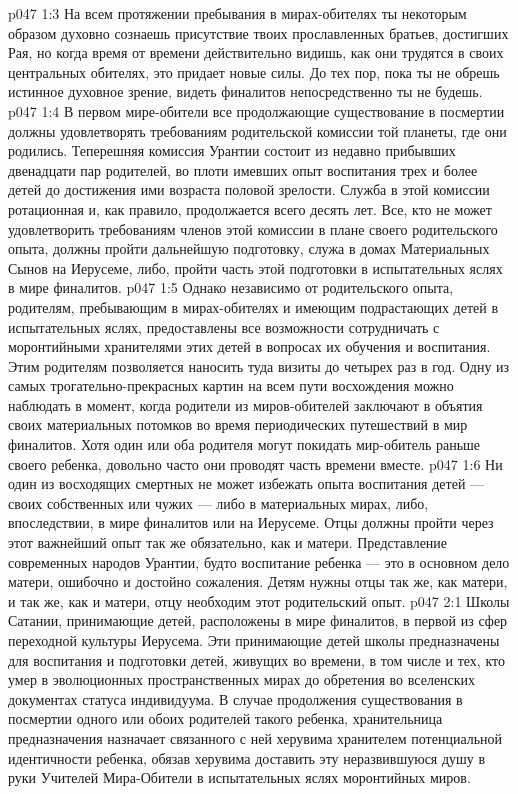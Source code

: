 \vs p047 1:3 На всем протяжении пребывания в мирах\hyp{}обителях ты некоторым образом духовно сознаешь присутствие твоих прославленных братьев, достигших Рая, но когда время от времени действительно видишь, как они трудятся в своих центральных обителях, это придает новые силы. До тех пор, пока ты не обрешь истинное духовное зрение, видеть финалитов непосредственно ты не будешь.
\vs p047 1:4 \pc В первом мире\hyp{}обители все продолжающие существование в посмертии должны удовлетворять требованиям родительской комиссии той планеты, где они родились. Теперешняя комиссия Урантии состоит из недавно прибывших двенадцати пар родителей, во плоти имевших опыт воспитания трех и более детей до достижения ими возраста половой зрелости. Служба в этой комиссии ротационная и, как правило, продолжается всего десять лет. Все, кто не может удовлетворить требованиям членов этой комиссии в плане своего родительского опыта, должны пройти дальнейшую подготовку, служа в домах Материальных Сынов на Иерусеме, либо, пройти часть этой подготовки в испытательных яслях в мире финалитов.
\vs p047 1:5 Однако независимо от родительского опыта, родителям, пребывающим в мирах\hyp{}обителях и имеющим подрастающих детей в испытательных яслях, предоставлены все возможности сотрудничать с моронтийными хранителями этих детей в вопросах их обучения и воспитания. Этим родителям позволяется наносить туда визиты до четырех раз в год. Одну из самых трогательно\hyp{}прекрасных картин на всем пути восхождения можно наблюдать в момент, когда родители из миров\hyp{}обителей заключают в объятия своих материальных потомков во время периодических путешествий в мир финалитов. Хотя один или оба родителя могут покидать мир\hyp{}обитель раньше своего ребенка, довольно часто они проводят часть времени вместе.
\vs p047 1:6 Ни один из восходящих смертных не может избежать опыта воспитания детей --- своих собственных или чужих --- либо в материальных мирах, либо, впоследствии, в мире финалитов или на Иерусеме. Отцы должны пройти через этот важнейший опыт так же обязательно, как и матери. Представление современных народов Урантии, будто воспитание ребенка --- это в основном дело матери, ошибочно и достойно сожаления. Детям нужны отцы так же, как матери, и так же, как и матери, отцу необходим этот родительский опыт.
\vs p047 2:1 Школы Сатании, принимающие детей, расположены в мире финалитов, в первой из сфер переходной культуры Иерусема. Эти принимающие детей школы предназначены для воспитания и подготовки детей, живущих во времени, в том числе и тех, кто умер в эволюционных пространственных мирах до обретения во вселенских документах статуса индивидуума. В случае продолжения существования в посмертии одного или обоих родителей такого ребенка, хранительница предназначения назначает связанного с ней херувима хранителем потенциальной идентичности ребенка, обязав херувима доставить эту неразвившуюся душу в руки Учителей Мира\hyp{}Обители в испытательных яслях моронтийных миров.
